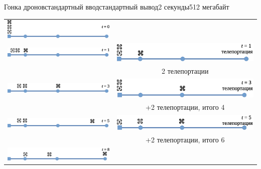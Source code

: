 \begin{problem}{Гонка дронов}{стандартный ввод}{стандартный вывод}{2 секунды}{512 мегабайт}
\begin{center}
\begin{tabular}{cc}
\includegraphics[scale=0.5]{sample-3-01.eps}\\[0.5cm]
\includegraphics[scale=0.5]{sample-3-02.eps}&
\includegraphics[scale=0.5]{sample-3-03.eps}\\
&2 телепортации\\[0.5cm]
\includegraphics[scale=0.5]{sample-3-04.eps}&
\includegraphics[scale=0.5]{sample-3-05.eps}\\
&+2 телепортации, итого 4\\[0.5cm]
\includegraphics[scale=0.5]{sample-3-06.eps}&
\includegraphics[scale=0.5]{sample-3-07.eps}\\
&+2 телепортации, итого 6\\[0.5cm]
\includegraphics[scale=0.5]{sample-3-08.eps}&

\end{tabular}
\end{center}
\end{problem}
